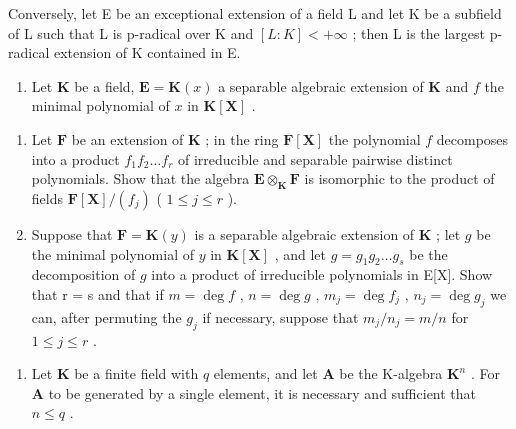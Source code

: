 Conversely, let E be an exceptional extension of a field L and let K be a subfield of L such that L is p-radical over K and \([L:K]<+\infty\) ; then L is the largest p-radical extension of K contained in E.

\begin{enumerate}
\def\labelenumi{\arabic{enumi})}
\setcounter{enumi}{3}
\tightlist
\item
  Let \(\mathbf{K}\) be a field, \(\mathbf{E} = \mathbf{K}(x)\) a separable algebraic extension of \(\mathbf{K}\) and \(f\) the minimal polynomial of \(x\) in \(\mathbf{K}[\mathbf{X}]\) .
\end{enumerate}

\begin{enumerate}
\def\labelenumi{\alph{enumi})}
\item
  Let \(\mathbf{F}\) be an extension of \(\mathbf{K}\) ; in the ring \(\mathbf{F}[\mathbf{X}]\) the polynomial \(f\) decomposes into a product \(f_{1}f_{2}\ldots f_{r}\) of irreducible and separable pairwise distinct polynomials. Show that the algebra \(\mathbf{E} \otimes_{\mathbf{K}} \mathbf{F}\) is isomorphic to the product of fields \(\mathbf{F}[\mathbf{X}] / (f_j)\) ( \(1 \leqslant j \leqslant r\) ).
\item
  Suppose that \(\mathbf{F} = \mathbf{K}(y)\) is a separable algebraic extension of \(\mathbf{K}\) ; let \(g\) be the minimal polynomial of \(y\) in \(\mathbf{K}[\mathbf{X}]\) , and let \(g = g_1g_2\ldots g_s\) be the decomposition of \(g\) into a product of irreducible polynomials in E{[}X{]}. Show that r = s and that if \(m = \deg f\) , \(n = \deg g\) , \(m_j = \deg f_j\) , \(n_j = \deg g_j\) we can, after permuting the \(g_j\) if necessary, suppose that \(m_j / n_j = m / n\) for \(1 \leq j \leq r\) .
\end{enumerate}

\begin{enumerate}
\def\labelenumi{\arabic{enumi})}
\setcounter{enumi}{4}
\tightlist
\item
  Let \(\mathbf{K}\) be a finite field with \(q\) elements, and let \(\mathbf{A}\) be the K-algebra \(\mathbf{K}^n\) . For \(\mathbf{A}\) to be generated by a single element, it is necessary and sufficient that \(n \leqslant q\) .
\end{enumerate}


